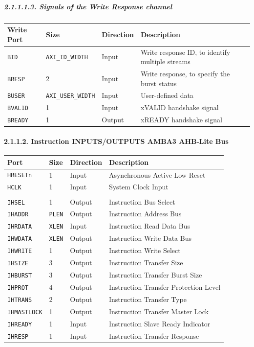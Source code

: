 \documentclass[
]{article}
\begin{document}
\hypertarget{signals-of-the-write-response-channel}{%
\subparagraph{2.1.1.1.3. Signals of the Write Response
channel}\label{signals-of-the-write-response-channel}}

\begin{longtable}[]{@{}llll@{}}
\toprule
Write Port & Size & Direction & Description\tabularnewline
\midrule
\endhead
\texttt{BID} & \texttt{AXI\_ID\_WIDTH} & Input & Write response ID, to
identify multiple streams\tabularnewline
\texttt{BRESP} & 2 & Input & Write response, to specify the burst
status\tabularnewline
\texttt{BUSER} & \texttt{AXI\_USER\_WIDTH} & Input & User-defined
data\tabularnewline
\texttt{BVALID} & 1 & Input & xVALID handshake signal\tabularnewline
\texttt{BREADY} & 1 & Output & xREADY handshake signal\tabularnewline
\bottomrule
\end{longtable}

\hypertarget{instruction-inputsoutputs-amba3-ahb-lite-bus}{%
\paragraph{2.1.1.2. Instruction INPUTS/OUTPUTS AMBA3 AHB-Lite
Bus}\label{instruction-inputsoutputs-amba3-ahb-lite-bus}}

\begin{longtable}[]{@{}llll@{}}
\toprule
Port & Size & Direction & Description\tabularnewline
\midrule
\endhead
\texttt{HRESETn} & 1 & Input & Asynchronous Active Low
Reset\tabularnewline
\texttt{HCLK} & 1 & Input & System Clock Input\tabularnewline
& & &\tabularnewline
\texttt{IHSEL} & 1 & Output & Instruction Bus Select\tabularnewline
\texttt{IHADDR} & \texttt{PLEN} & Output & Instruction Address
Bus\tabularnewline
\texttt{IHRDATA} & \texttt{XLEN} & Input & Instruction Read Data
Bus\tabularnewline
\texttt{IHWDATA} & \texttt{XLEN} & Output & Instruction Write Data
Bus\tabularnewline
\texttt{IHWRITE} & 1 & Output & Instruction Write Select\tabularnewline
\texttt{IHSIZE} & 3 & Output & Instruction Transfer Size\tabularnewline
\texttt{IHBURST} & 3 & Output & Instruction Transfer Burst
Size\tabularnewline
\texttt{IHPROT} & 4 & Output & Instruction Transfer Protection
Level\tabularnewline
\texttt{IHTRANS} & 2 & Output & Instruction Transfer Type\tabularnewline
\texttt{IHMASTLOCK} & 1 & Output & Instruction Transfer Master
Lock\tabularnewline
\texttt{IHREADY} & 1 & Input & Instruction Slave Ready
Indicator\tabularnewline
\texttt{IHRESP} & 1 & Input & Instruction Transfer
Response\tabularnewline
\bottomrule
\end{longtable}
\end{document}
